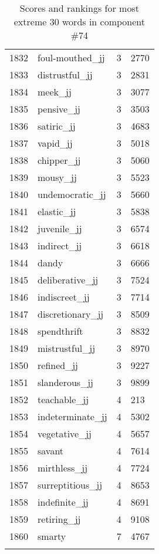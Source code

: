 \begin{longtable}[!htbp]{| rlr@{.}l |}
    1832 & foul-mouthed\_jj & 3 & 2770 \\
    1833 & distrustful\_jj & 3 & 2831 \\
    1834 & meek\_jj & 3 & 3077 \\
    1835 & pensive\_jj & 3 & 3503 \\
    1836 & satiric\_jj & 3 & 4683 \\
    1837 & vapid\_jj & 3 & 5018 \\
    1838 & chipper\_jj & 3 & 5060 \\
    1839 & mousy\_jj & 3 & 5523 \\
    1840 & undemocratic\_jj & 3 & 5660 \\
    1841 & elastic\_jj & 3 & 5838 \\
    1842 & juvenile\_jj & 3 & 6574 \\
    1843 & indirect\_jj & 3 & 6618 \\
    1844 & dandy & 3 & 6666 \\
    1845 & deliberative\_jj & 3 & 7524 \\
    1846 & indiscreet\_jj & 3 & 7714 \\
    1847 & discretionary\_jj & 3 & 8509 \\
    1848 & spendthrift & 3 & 8832 \\
    1849 & mistrustful\_jj & 3 & 8970 \\
    1850 & refined\_jj & 3 & 9227 \\
    1851 & slanderous\_jj & 3 & 9899 \\
    1852 & teachable\_jj & 4 & 213 \\
    1853 & indeterminate\_jj & 4 & 5302 \\
    1854 & vegetative\_jj & 4 & 5657 \\
    1855 & savant & 4 & 7614 \\
    1856 & mirthless\_jj & 4 & 7724 \\
    1857 & surreptitious\_jj & 4 & 8653 \\
    1858 & indefinite\_jj & 4 & 8691 \\
    1859 & retiring\_jj & 4 & 9108 \\
    1860 & smarty & 7 & 4767 \\
    \hline
    \caption{Scores and rankings for most extreme 30 words in component \#74} \\
\end{longtable}
